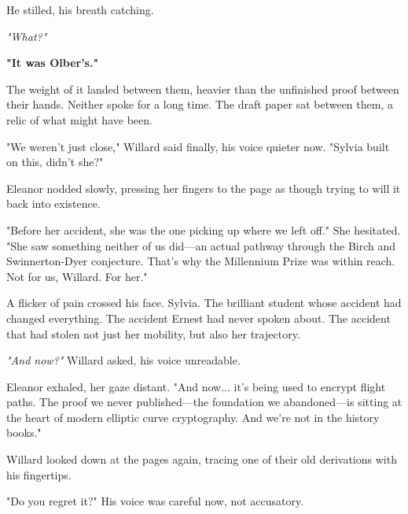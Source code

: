 \smallskip

He stilled, his breath catching.

\smallskip

\textit{"What?"}

\smallskip

\textbf{"It was Olber’s."}

\smallskip

The weight of it landed between them, heavier than the unfinished proof between their hands. Neither spoke for a long time. The draft paper sat between them, a relic of what might have been.

\smallskip

"We weren’t just close," Willard said finally, his voice quieter now. "Sylvia built on this, didn’t she?"

\smallskip

Eleanor nodded slowly, pressing her fingers to the page as though trying to will it back into existence.

\smallskip

"Before her accident, she was the one picking up where we left off." She hesitated. "She saw something neither of us did—an actual pathway through the Birch and Swinnerton-Dyer conjecture. That’s why the Millennium Prize was within reach. Not for us, Willard. For her."

\smallskip

A flicker of pain crossed his face. Sylvia. The brilliant student whose accident had changed everything. The accident Ernest had never spoken about. The accident that had stolen not just her mobility, but also her trajectory.

\smallskip

\textit{"And now?"} Willard asked, his voice unreadable.

\smallskip

Eleanor exhaled, her gaze distant. "And now... it’s being used to encrypt flight paths. The proof we never published—the foundation we abandoned—is sitting at the heart of modern elliptic curve cryptography. And we’re not in the history books."

\smallskip

Willard looked down at the pages again, tracing one of their old derivations with his fingertips.

\smallskip

"Do you regret it?" His voice was careful now, not accusatory.

\smallskip

